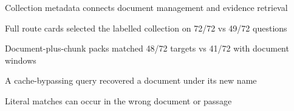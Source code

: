 \begin{highlights}
\item Collection metadata connects document management and evidence retrieval
\item Full route cards selected the labelled collection on 72/72 vs 49/72 questions
\item Document-plus-chunk packs matched 48/72 targets vs 41/72 with document windows
\item A cache-bypassing query recovered a document under its new name
\item Literal matches can occur in the wrong document or passage
\end{highlights}
